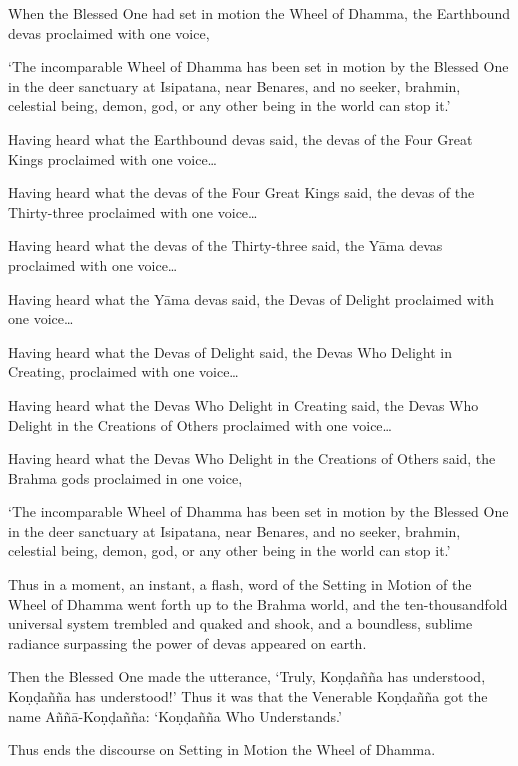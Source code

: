 When the Blessed One had set in motion the Wheel of Dhamma, the
Earthbound devas proclaimed with one voice,

‘The incomparable Wheel of Dhamma has been set in motion by the Blessed
One in the deer sanctuary at Isipatana, near Benares, and no seeker,
brahmin, celestial being, demon, god, or any other being in the world
can stop it.’

Having heard what the Earthbound devas said, the devas of the Four Great
Kings proclaimed with one voice\ldots

Having heard what the devas of the Four Great Kings said, the devas of
the Thirty-three proclaimed with one voice\ldots

Having heard what the devas of the Thirty-three said, the Yāma devas
proclaimed with one voice\ldots

Having heard what the Yāma devas said, the Devas of Delight proclaimed
with one voice\ldots

Having heard what the Devas of Delight said, the Devas Who Delight in
Creating, proclaimed with one voice\ldots

Having heard what the Devas Who Delight in Creating said, the Devas Who
Delight in the Creations of Others proclaimed with one voice\ldots

Having heard what the Devas Who Delight in the Creations of Others said,
the Brahma gods proclaimed in one voice,

‘The incomparable Wheel of Dhamma has been set in motion by the Blessed
One in the deer sanctuary at Isipatana, near Benares, and no seeker,
brahmin, celestial being, demon, god, or any other being in the world
can stop it.’

Thus in a moment, an instant, a flash, word of the Setting in Motion of
the Wheel of Dhamma went forth up to the Brahma world, and the
ten-thousandfold universal system trembled and quaked and shook, and a
boundless, sublime radiance surpassing the power of devas appeared on
earth.

\ifreferenceedition
\enlargethispage{\baselineskip}
\fi

Then the Blessed One made the utterance,
‘Truly, Koṇḍañña has understood, Koṇḍañña has understood!’ Thus it was
that the Venerable Koṇḍañña got the name Aññā-Koṇḍañña: ‘Koṇḍañña Who
Understands.’

Thus ends the discourse on Setting in Motion the Wheel of Dhamma.

